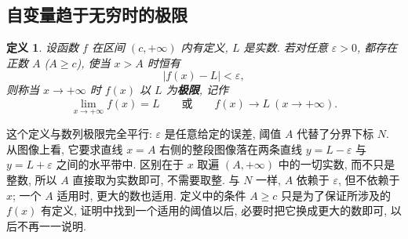 \documentclass[UTF8,openany]{ctexbook}
\theoremstyle{chinesetextbook}
\newtheorem{definition}{定义}[section]
\begin{document}
\subsection{自变量趋于无穷时的极限}
\begin{definition}
设函数 $f$ 在区间 $(c,+\infty)$ 内有定义, $L$ 是实数. 若对任意 $\varepsilon>0$, 都存在正数 $A$ ($A\ge c$), 使当 $x>A$ 时恒有
\[
|f(x)-L|<\varepsilon,
\]
则称当 $x\to+\infty$ 时 $f(x)$ 以 $L$ 为\textbf{极限}, 记作
\[
\lim_{x\to+\infty}f(x)=L\qquad\text{或}\qquad f(x)\to L\ (x\to+\infty).
\]
\end{definition}
这个定义与数列极限完全平行: $\varepsilon$ 是任意给定的误差, 阈值 $A$ 代替了分界下标 $N$. 从图像上看, 它要求直线 $x=A$ 右侧的整段图像落在两条直线 $y=L-\varepsilon$ 与 $y=L+\varepsilon$ 之间的水平带中. 区别在于 $x$ 取遍 $(A,+\infty)$ 中的一切实数, 而不只是整数, 所以 $A$ 直接取为实数即可, 不需要取整. 与 $N$ 一样, $A$ 依赖于 $\varepsilon$, 但不依赖于 $x$; 一个 $A$ 适用时, 更大的数也适用. 定义中的条件 $A\ge c$ 只是为了保证所涉及的 $f(x)$ 有定义, 证明中找到一个适用的阈值以后, 必要时把它换成更大的数即可, 以后不再一一说明.
\end{document}
